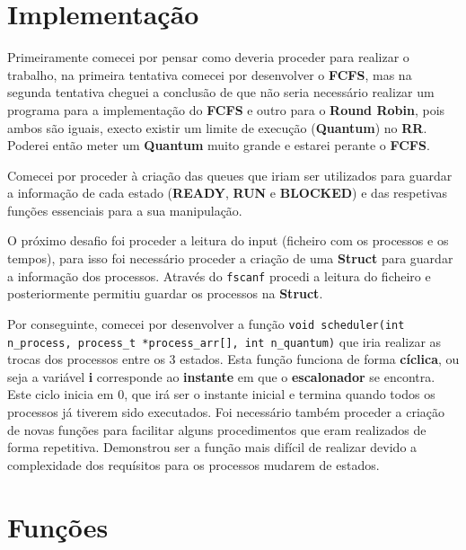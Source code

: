 \documentclass[11pt]{article}   %
\begin{document}
\section{Implementação}

\hspace{0,5cm}Primeiramente comecei por pensar como deveria proceder para realizar o trabalho, na primeira tentativa comecei por desenvolver o \textbf{FCFS}, mas na segunda tentativa cheguei a conclusão de que não seria necessário realizar um programa para a implementação do \textbf{FCFS} e outro para o \textbf{Round Robin}, pois ambos são iguais, execto existir um limite de execução (\textbf{Quantum}) no \textbf{RR}.
Poderei então meter um \textbf{Quantum} muito grande e estarei perante o \textbf{FCFS}. \par
Comecei por proceder à criação das queues que iriam ser utilizados para guardar a informação de cada estado (\textbf{READY}, \textbf{RUN} e \textbf{BLOCKED}) e das respetivas funções essenciais para a sua manipulação. \par
O próximo desafio foi proceder a leitura do input (ficheiro com os processos e os tempos), para isso foi necessário proceder a criação de uma \textbf{Struct} para guardar a informação dos processos.
Através do \verb|fscanf| procedi a leitura do ficheiro e posteriormente permitiu guardar os processos na \textbf{Struct}. \par
Por conseguinte, comecei por desenvolver a função \newline
\verb|void scheduler(int n_process, process_t *process_arr[], int n_quantum)| que iria realizar as trocas dos processos entre os 3 estados. 
Esta função funciona de forma \textbf{cíclica}, ou seja a variável \textbf{i} corresponde ao \textbf{instante} em que o \textbf{escalonador} se encontra.
Este ciclo inicia em 0, que irá ser o instante inicial e termina quando todos os processos já tiverem sido executados.
Foi necessário também proceder a criação de novas funções para facilitar alguns procedimentos que eram realizados de forma repetitiva.
Demonstrou ser a função mais difícil de realizar devido a complexidade dos requísitos para os processos mudarem de estados. 
\section{Funções}
    
\end{document}
